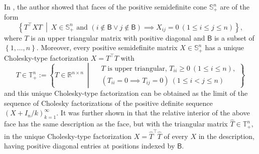 \documentclass[oneside]{amsart}
\theoremstyle{plain}
\theoremstyle{definition}
\theoremstyle{remark}
\numberwithin{equation}{section}
\begin{document}
In \cite[\S2]{Chua06}, the author showed that faces of the positive
semidefinite cone $\mathbb{S}^{n}_{+}$ are of the form
\[
\left\{T^{\top} X T\ \middle|\ X \in \mathbb{S}^{n}_{+} \text{ and } (i
\notin \mathsf{B} \vee j \notin \mathsf{B}) \implies X_{ij} = 0 \ (1 \leq i
\leq j \leq n)\right\},
\]
where $T$ is an upper triangular matrix with positive diagonal and
$\mathsf{B}$ is a subset of $\left\{1, \dotsc, n\right\}$. Moreover, every
positive semidefinite matrix $X \in \mathbb{S}^{n}_{+}$ has a unique
Cholesky-type factorization $X = T^{\top} T$ with
\[
T \in \mathbb{T}^{n}_{+} := \left\{T \in \mathbb{R}^{n \times n}\ \middle|\
\begin{aligned}
&T \text{ is upper triangular, } T_{ii} \geq 0 \ (1 \leq i \leq n),
\\
& (T_{ii} = 0 \implies T_{ij} = 0) \ (1 \leq i < j \leq n)
\end{aligned}
\right\}
\]
and this unique Cholesky-type factorization can be obtained as the limit of
the sequence of Cholesky factorizations of the positive definite sequence
$\left( X + I_{n} / k \right)_{k=1}^\infty$. It was further shown in
\cite{Chua06} that the relative interior of the above face has the same
description as the face, but with the triangular matrix $\hat{T} \in
\mathbb{T}^{n}_{+}$, in the unique Cholesky-type factorization $X =
\hat{T}^{\top} \hat{T}$ of every $X$ in the description, having positive
diagonal entries at positions indexed by $\mathsf{B}$.
\end{document}
